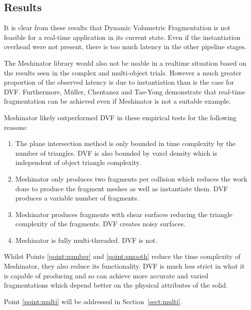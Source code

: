 \FloatBarrier

\subsection{Results}

\label{sect:results}

It is clear from these results that Dynamic Volumetric Fragmentation is not feasible for a real-time application in its current state. Even if the instantiation overhead were not present, there is too much latency in the other pipeline stages. 

The Meshinator library would also not be usable in a realtime situation based on the results seen in the complex and multi-object trials. However a much greater proportion of the observed latency is due to instantiation than is the case for DVF. Furthermore, M\"{u}ller, Chentanez and Tae-Yong demonstrate that real-time fragmentation can be achieved even if Meshinator is not a suitable example\cite{Muller:2013:RTD:2461912.2461934}.

Meshinator likely outperformed DVF in these empirical tests for the following reasons:

\begin{enumerate}
\item{The plane intersection method is only bounded in time complexity by the number of triangles. DVF is also bounded by voxel density which is independent of object triangle complexity.}
\item{Meshinator only produces two fragments per collision which reduces the work done to produce the fragment meshes as well as instantiate them. DVF produces a variable number of fragments.}
\label{point:number}
\item{Meshinator produces fragments with shear surfaces reducing the triangle complexity of the fragments. DVF creates noisy surfaces.}
\label{point:smooth}
\item{Meshinator is fully multi-threaded. DVF is not.}
\label{point:multi}
\end{enumerate}

Whilst Points \ref{point:number} and \ref{point:smooth} reduce the time complexity of Meshinator, they also reduce its functionality. DVF is much less strict in what it is capable of producing and so can achieve more accurate and varied fragmentations which depend better on the physical attributes of the solid.

Point \ref{point:multi} will be addressed in Section~\ref{sect:multi}.

